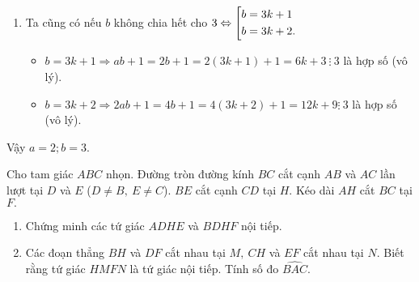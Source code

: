 \begin{ex}
{\begin{enumerate}
\begin{enumerate}[+]
				\item Ta cũng có nếu $b$ không chia hết cho $3 \Leftrightarrow \left[\begin{aligned}&b=3k+1\\&b=3k+2.\end{aligned}\right.$\\
				\begin{itemize}
					\item $b=3k+1 \Rightarrow ab+1 = 2b+1=2(3k+1)+1=6k+3\ \vdots\ 3$ là hợp số (vô lý).
					\item $b=3k+2 \Rightarrow 2ab+1 = 4b+1 = 4(3k+2)+1=12k+9\vdots\ 3$ là hợp số (vô lý).
				\end{itemize}
			\end{enumerate}
 			Vậy $a=2;b=3.$
		\end{enumerate}

	}
\end{ex}


\begin{ex}%
	Cho tam giác $ABC$ nhọn. Đường tròn đường kính $BC$ cắt cạnh $AB$ và $AC$ lần lượt tại $D$ và $E$ ($D \neq B,\ E \neq C$). $BE$ cắt cạnh $CD$ tại $H.$ Kéo dài $AH$ cắt $BC$ tại $F.$
	\begin{enumerate}
	 	\item Chứng minh các tứ giác $ADHE$ và $BDHF$ nội tiếp.
	 	\item Các đoạn thẳng $BH$ và $DF$ cắt nhau tại $M,\ CH$ và $EF$ cắt nhau tại $N.$ Biết rằng tứ giác $HMFN$ là tứ giác nội tiếp. Tính số đo $\widehat{BAC}.$
	 \end{enumerate} 
\end{ex}
